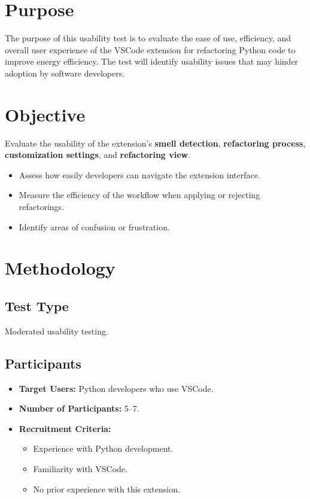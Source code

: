 \documentclass[12pt, titlepage]{article}
\begin{document}
\section*{Purpose}
The purpose of this usability test is to evaluate the ease of use,
efficiency, and overall user experience of the VSCode extension for
refactoring Python code to improve energy efficiency. The test will
identify usability issues that may hinder adoption by software developers.

\section*{Objective}
Evaluate the usability of the extension’s \textbf{smell detection},
\textbf{refactoring process}, \textbf{customization settings}, and
\textbf{refactoring view}.

\begin{itemize}
  \item Assess how easily developers can navigate the extension interface.
  \item Measure the efficiency of the workflow when applying or
    rejecting refactorings.
  \item Identify areas of confusion or frustration.
\end{itemize}

\section*{Methodology}
\subsection*{Test Type}
Moderated usability testing.

\subsection*{Participants}
\begin{itemize}
  \item \textbf{Target Users:} Python developers who use VSCode.
  \item \textbf{Number of Participants:} 5–7.
  \item \textbf{Recruitment Criteria:}
    \begin{itemize}
      \item Experience with Python development.
      \item Familiarity with VSCode.
      \item No prior experience with this extension.
    \end{itemize}
\end{itemize}
\end{document}
